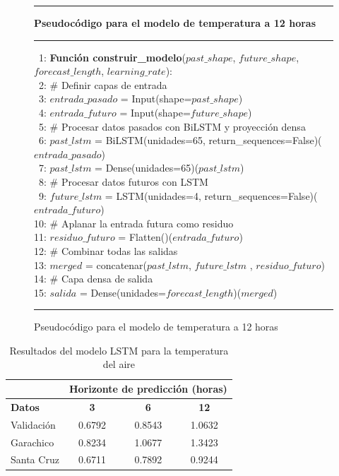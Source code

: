 \begin{figure}[H]
{\small
\hrule
{\bf\small Pseudocódigo para el modelo de temperatura a 12 horas}
\hrule
\begin{center}
\begin{tabbing}
\ 1: {\bf Fun}\={\bf ción construir\_modelo}($past\_shape$, $future\_shape$, $forecast\_length$, $learning\_rate$): \\
\ 2: \> \# Definir capas de entrada \\
\ 3: \> $entrada\_pasado$ = Input(shape=$past\_shape$) \\
\ 4: \> $entrada\_futuro$ = Input(shape=$future\_shape$) \\
\ 5: \> \# Procesar datos pasados con BiLSTM y proyección densa \\
\ 6: \> $past\_lstm$ = BiLSTM(unidades=65, return\_sequences=False)($entrada\_pasado$) \\
\ 7: \> $past\_lstm$ = Dense(unidades=65)($past\_lstm$) \\
\ 8: \> \# Procesar datos futuros con LSTM \\
\ 9: \> $future\_lstm$ = LSTM(unidades=4, return\_sequences=False)($entrada\_futuro$) \\
10: \> \# Aplanar la entrada futura como residuo \\
11: \> $residuo\_futuro$ = Flatten()($entrada\_futuro$) \\
12: \> \# Combinar todas las salidas \\
13: \> $merged$ = concatenar($past\_lstm$, $future\_lstm$ , $residuo\_futuro$) \\
14: \> \# Capa densa de salida \\
15: \> $salida$ = Dense(unidades=$forecast\_length$)($merged$) \\
\end{tabbing}
\end{center}
}
\hrule
\caption{Pseudocódigo para el modelo de temperatura a 12 horas}
\label{lstm_model_temp_12h}
\end{figure}


\begin{table}[h!]
\centering
\begin{tabular}{|l|c|c|c|}
\hline
\multicolumn{1}{|c|}{} & \multicolumn{3}{c|}{\textbf{Horizonte de predicción (horas)}} \\
\hline
\textbf{Datos} & \textbf{3} & \textbf{6} & \textbf{12} \\
\hline
Validación   &      0.6792           &     0.8543       &         1.0632            \\
\hline
Garachico    &        0.8234         &      1.0677            &         1.3423            \\
\hline
Santa Cruz &       0.6711          &    0.7892          &          0.9244           \\
\hline
\end{tabular}
\caption{Resultados del modelo LSTM para la temperatura del aire}
\label{temp_results}
\end{table}


